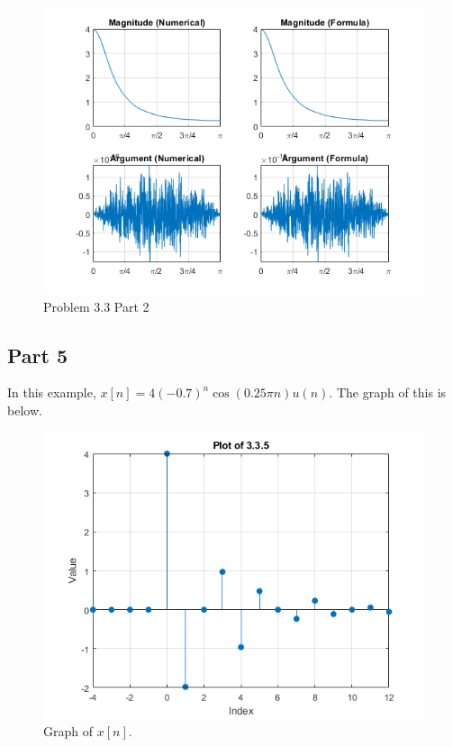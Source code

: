 \documentclass{article}
\begin{document}
\begin{figure}[H]
    \centering
    \includegraphics[width=\textwidth]{html/Homework3_03.png}
    \caption{Problem 3.3 Part 2}
    \label{3.3.2}
\end{figure}

\subsection*{Part 5}
In this example, \(x[n] = 4(-0.7)^n \cos(0.25\pi n)u(n)\). The
graph of this is below.
\begin{figure}[H]
    \centering
    \includegraphics[width=\textwidth]{Images/Problem-3-2-5.png}
    \caption{Graph of \(x[n]\).}
    \label{plot 3.3.5}
\end{figure}
\end{document}
